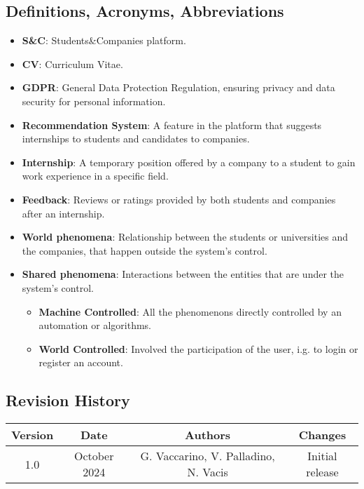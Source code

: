 \subsection{Definitions, Acronyms, Abbreviations}
\begin{itemize}
    \item \textbf{S\&C}: Students\&Companies platform.
    \item \textbf{CV}: Curriculum Vitae.
    \item \textbf{GDPR}: General Data Protection Regulation, ensuring privacy and data security for personal information.
    \item \textbf{Recommendation System}: A feature in the platform that suggests internships to students and candidates to companies.
    \item \textbf{Internship}: A temporary position offered by a company to a student to gain work experience in a specific field.
    \item \textbf{Feedback}: Reviews or ratings provided by both students and companies after an internship.
    \item \textbf{World phenomena}: Relationship between the students or universities and the companies, that happen outside the system's control.
    \item \textbf{Shared phenomena}: Interactions between the entities that are under the system's control.
    \begin{itemize}
        \item \textbf{Machine Controlled}: All the phenomenons directly controlled by an automation or algorithms.  
        \item \textbf{World Controlled}: Involved the participation of the user, i.g. to login or register an account.
    \end{itemize}
\end{itemize}

\subsection{Revision History}
    
\begin{tabular}{|c|c|c|c|}
    \hline
    Version & Date & Authors & Changes \\
    \hline
    1.0 & October 2024 & G. Vaccarino, V. Palladino, N. Vacis & Initial release \\
    \hline
\end{tabular}

\vspace{7mm}


